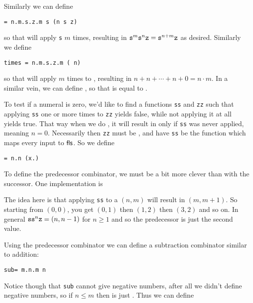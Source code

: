 Similarly we can define

\centerline{\tt \plus = \lambda n.\lambda m.\lambda s.\lambda z.m s (n s z)}

so that  will apply {\tt s}  $m$ times, resulting in ${\tt s}^m{\tt s}^n{\tt z}={\tt s}^{n+m}{\tt z}$ as desired.
Similarly we define

\smallskip
\centerline{\tt times = \lambda n.\lambda m.\lambda s.\lambda z.m (\plus\ n) }

so that  will apply  $m$ times to , resulting in $n+n+\cdots+n+0=n\cdot m$.
In a similar vein, we can define , so that  is equal to .

To test if a numeral is zero, we'd like to find a functions {\tt ss} and {\tt zz} such that applying {\tt ss} one or more times to {\tt zz} yields false, while not applying it at all yields true.
That way when we do , it will result in \tru{} only if {\tt ss} was never applied, meaning $n=0$.
Necessarily then {\tt zz} must be \tru, and have {\tt ss} be the function which maps every input to ${\sf fls}$.
So we define

\smallskip
\centerline{\tt\iszro = \lambda n.n (\lambda x.\fls) \tru}

To define the predecessor combinator, we must be a bit more clever than with the successor.
One implementation is

\smallskip
\centerline{\vbox{}}

The idea here is that applying {\tt ss} to a $(n,m)$ will result in $(m,m+1)$.
So starting from $(0,0)$, you get $(0,1)$ then $(1,2)$ then $(3,2)$ and so on.
In general ${\tt ss}^n{\tt z}=(n,n-1)$ for $n\geq1$ and so the predecessor is just the second value.

Using the predecessor combinator we can define a subtraction combinator similar to addition:

\smallskip
\centerline{\tt sub= \lambda m.\lambda n.m \prd n}

Notice though that {\tt sub} cannot give negative numbers, after all we didn't define negative numbers, so if $n\leq m$ then  is just .
Thus we can define

